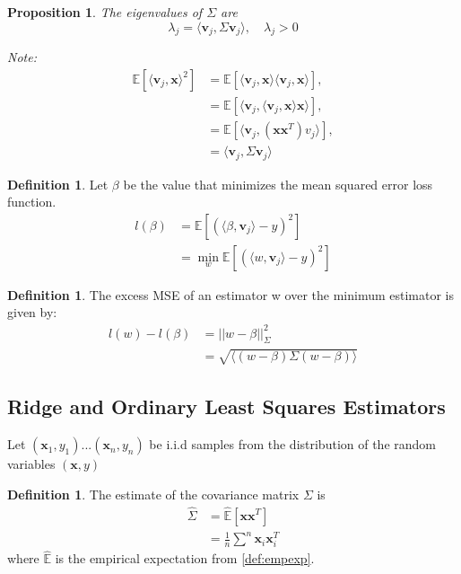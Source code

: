 \documentclass[nohyperref]{article}
\theoremstyle{plain}
\newtheorem{proposition}[theorem]{Proposition}
\theoremstyle{definition}
\newtheorem{definition}[theorem]{Definition}
\theoremstyle{remark}
\begin{document}
\begin{proposition}
\label{prop:eigval}
The eigenvalues of $\Sigma$ are $$\lambda_j = \langle \textbf{v}_j, \Sigma \textbf{v}_j \rangle, \quad \lambda_j > 0$$

Note: 
\begin{align*}
    \mathbb{E}[\langle \textbf{v}_j, \textbf{x} \rangle^2] &= \mathbb{E}[\langle \textbf{v}_j, \textbf{x} \rangle \langle \textbf{v}_j, \textbf{x} \rangle], \\
    &= \mathbb{E}[\langle \textbf{v}_j, \langle \textbf{v}_j, \textbf{x} \rangle \textbf{x} \rangle], \\
    &= \mathbb{E}[\langle \textbf{v}_j, (\textbf{xx}^T)v_j \rangle], \\
    &= \langle \textbf{v}_j, \Sigma \textbf{v}_j \rangle
\end{align*}
\end{proposition}

\begin{definition}
\label{def:minMSE}
Let $\beta$ be the value that minimizes the mean squared error loss function.
\begin{align*}
    l(\beta) &= \mathbb{E}[(\langle \beta, \textbf{v}_j \rangle - y)^2] \\
    &= \min_w \mathbb{E}[(\langle w, \textbf{v}_j \rangle - y)^2]
\end{align*}
\end{definition}

\begin{definition}
\label{def:excessMSE}
The excess MSE of an estimator w over the minimum estimator is given by:
\begin{align*}
    l(w) - l(\beta) &= ||w - \beta||^2_{\Sigma} \\
    &= \sqrt{\langle (w - \beta) \Sigma(w - \beta)\rangle}
\end{align*}
\end{definition}



\subsection{Ridge and Ordinary Least Squares Estimators}
Let $(\textbf{x}_1, y_1)...(\textbf{x}_n, y_n)$ be i.i.d samples from the distribution of the random variables $(\textbf{x}, y)$

\begin{definition}
\label{def:covEst}
The estimate of the covariance matrix $\Sigma$ is 
\begin{align*}
    \hat{\Sigma} &= \hat{\mathbb{E}}[\textbf{xx}^T] \\
    &= \frac{1}{n} \sum^n \textbf{x}_i \textbf{x}_i^T
\end{align*}
where $\hat{\mathbb{E}}$ is the empirical expectation from \cref{def:empexp}.
\end{definition}
\end{document}
